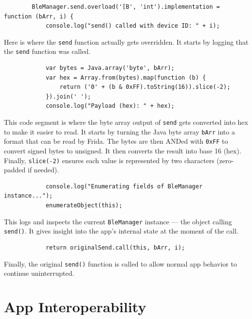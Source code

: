 	\begin{lstlisting}
		BleManager.send.overload('[B', 'int').implementation = function (bArr, i) {
			console.log("send() called with device ID: " + i);
		\end{lstlisting}
		Here is where the \texttt{send} function actually gets overridden. It starts by logging that the \texttt{send} function was called.
		
		\begin{lstlisting}
			var bytes = Java.array('byte', bArr);
			var hex = Array.from(bytes).map(function (b) {
				return ('0' + (b & 0xFF).toString(16)).slice(-2);
			}).join(' ');
			console.log("Payload (hex): " + hex);
		\end{lstlisting}
		This code segment is where the byte array output of \texttt{send} gets converted into hex to make it easier to read. It starts by turning the Java byte array \texttt{bArr} into a format that can be read by Frida. The bytes are then ANDed with \texttt{0xFF} to convert signed bytes to unsigned. It then converts the result into base 16 (hex). Finally, \texttt{slice(-2)} ensures each value is represented by two characters (zero-padded if needed).
		
		\begin{lstlisting}
			console.log("Enumerating fields of BleManager instance...");
			enumerateObject(this);
		\end{lstlisting}
		This logs and inspects the current \texttt{BleManager} instance — the object calling \texttt{send()}. It gives insight into the app’s internal state at the moment of the call.
		
		\begin{lstlisting}
			return originalSend.call(this, bArr, i);
\end{lstlisting}
Finally, the original \texttt{send()} function is called to allow normal app behavior to continue uninterrupted.


\section{App Interoperability}


